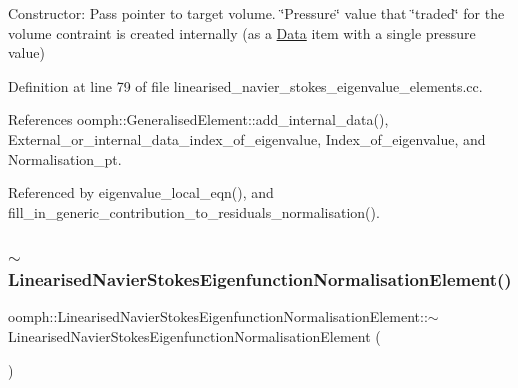 Constructor\+: Pass pointer to target volume. \char`\"{}\+Pressure\char`\"{} value that \char`\"{}traded\char`\"{} for the volume contraint is created internally (as a \hyperlink{classoomph_1_1Data}{Data} item with a single pressure value) 



Definition at line 79 of file linearised\+\_\+navier\+\_\+stokes\+\_\+eigenvalue\+\_\+elements.\+cc.



References oomph\+::\+Generalised\+Element\+::add\+\_\+internal\+\_\+data(), External\+\_\+or\+\_\+internal\+\_\+data\+\_\+index\+\_\+of\+\_\+eigenvalue, Index\+\_\+of\+\_\+eigenvalue, and Normalisation\+\_\+pt.



Referenced by eigenvalue\+\_\+local\+\_\+eqn(), and fill\+\_\+in\+\_\+generic\+\_\+contribution\+\_\+to\+\_\+residuals\+\_\+normalisation().

\mbox{\label{classoomph_1_1LinearisedNavierStokesEigenfunctionNormalisationElement_aa4f7bbda23fcf498f79b5e18c4a96f3b}} 
\subsubsection{\texorpdfstring{$\sim$\+Linearised\+Navier\+Stokes\+Eigenfunction\+Normalisation\+Element()}{~LinearisedNavierStokesEigenfunctionNormalisationElement()}}
{\footnotesize\ttfamily oomph\+::\+Linearised\+Navier\+Stokes\+Eigenfunction\+Normalisation\+Element\+::$\sim$\+Linearised\+Navier\+Stokes\+Eigenfunction\+Normalisation\+Element (\begin{DoxyParamCaption}{ }\end{DoxyParamCaption})\hspace{0.3cm}{\ttfamily [inline]}}



